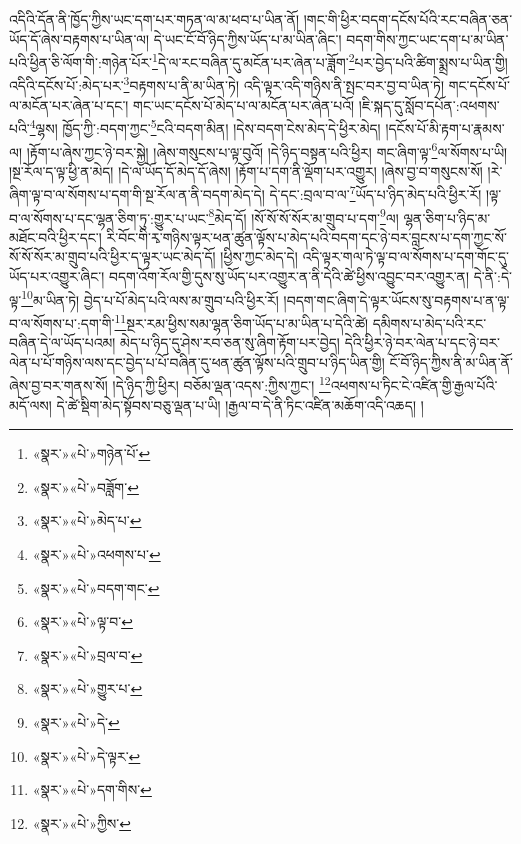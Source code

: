 འདིའི་དོན་ནི་ཁྱོད་ཀྱིས་ཡང་དག་པར་གཏན་ལ་མ་ཕབ་པ་ཡིན་ནོ། །གང་གི་ཕྱིར་བདག་དངོས་པོའི་རང་བཞིན་ཅན་ཡོད་དོ་ཞེས་བརྟགས་པ་ཡིན་ལ། དེ་ཡང་ངོ་བོ་ཉིད་ཀྱིས་ཡོད་པ་མ་ཡིན་ཞིང་། བདག་གིས་ཀྱང་ཡང་དག་པ་མ་ཡིན་པའི་ཕྱིན་ཅི་ལོག་གི་:གཉེན་པོར་\footnote{«སྣར་»«པེ་»གཉེན་པོ་}དེ་ལ་རང་བཞིན་དུ་མངོན་པར་ཞེན་པ་ཟློག་\footnote{«སྣར་»«པེ་»བཟློག་}པར་བྱེད་པའི་ཚིག་སྨྲས་པ་ཡིན་གྱི། འདིའི་དངོས་པོ་:མེད་པར་\footnote{«སྣར་»«པེ་»མེད་པ་}བརྟགས་པ་ནི་མ་ཡིན་ཏེ། འདི་ལྟར་འདི་གཉིས་ནི་སྤང་བར་བྱ་བ་ཡིན་ཏེ། གང་དངོས་པོ་ལ་མངོན་པར་ཞེན་པ་དང་། གང་ཡང་དངོས་པོ་མེད་པ་ལ་མངོན་པར་ཞེན་པའོ། །ཇི་སྐད་དུ་སློབ་དཔོན་:འཕགས་པའི་\footnote{«སྣར་»«པེ་»འཕགས་པ་}ལྷས། ཁྱོད་ཀྱི་:བདག་ཀྱང་\footnote{«སྣར་»«པེ་»བདག་གང་}ངའི་བདག་མིན། །དེས་བདག་ངེས་མེད་དེ་ཕྱིར་མེད། །དངོས་པོ་མི་རྟག་པ་རྣམས་ལ། །རྟོག་པ་ཞེས་ཀྱང་ཉེ་བར་སྐྱེ། །ཞེས་གསུངས་པ་ལྟ་བུའོ། །དེ་ཉིད་བསྟན་པའི་ཕྱིར། གང་ཞིག་ལྟ་\footnote{«སྣར་»«པེ་»ལྟ་བ་}ལ་སོགས་པ་ཡི། །སྔ་རོལ་ད་ལྟ་ཕྱི་ན་མེད། །དེ་ལ་ཡོད་དོ་མེད་དོ་ཞེས། །རྟོག་པ་དག་ནི་ལྡོག་པར་འགྱུར། །ཞེས་བྱ་བ་གསུངས་སོ། །རེ་ཞིག་ལྟ་བ་ལ་སོགས་པ་དག་གི་སྔ་རོལ་ན་ནི་བདག་མེད་དེ། དེ་དང་:བྲལ་བ་ལ་\footnote{«སྣར་»«པེ་»བྲལ་བ་}ཡོད་པ་ཉིད་མེད་པའི་ཕྱིར་རོ། །ལྟ་བ་ལ་སོགས་པ་དང་ལྷན་ཅིག་ཏུ་:གྱུར་པ་ཡང་\footnote{«སྣར་»«པེ་»གྱུར་པ་}མེད་དོ། །སོ་སོ་སོ་སོར་མ་གྲུབ་པ་དག་\footnote{«སྣར་»«པེ་»དེ་}ལ། ལྷན་ཅིག་པ་ཉིད་མ་མཐོང་བའི་ཕྱིར་དང་། རི་བོང་གི་རྭ་གཉིས་ལྟར་ཕན་ཚུན་ལྟོས་པ་མེད་པའི་བདག་དང་ཉེ་བར་བླངས་པ་དག་ཀྱང་སོ་སོ་སོ་སོར་མ་གྲུབ་པའི་ཕྱིར་ད་ལྟར་ཡང་མེད་དོ། །ཕྱིས་ཀྱང་མེད་དེ། འདི་ལྟར་གལ་ཏེ་ལྟ་བ་ལ་སོགས་པ་དག་གོང་དུ་ཡོད་པར་འགྱུར་ཞིང་། བདག་འོག་རོལ་གྱི་དུས་སུ་ཡོད་པར་འགྱུར་ན་ནི་དེའི་ཚེ་ཕྱིས་འབྱུང་བར་འགྱུར་ན། དེ་ནི་:དེ་ལྟ་\footnote{«སྣར་»«པེ་»དེ་ལྟར་}མ་ཡིན་ཏེ། བྱེད་པ་པོ་མེད་པའི་ལས་མ་གྲུབ་པའི་ཕྱིར་རོ། །བདག་གང་ཞིག་དེ་ལྟར་ཡོངས་སུ་བརྟགས་པ་ན་ལྟ་བ་ལ་སོགས་པ་:དག་གི་\footnote{«སྣར་»«པེ་»དག་གིས་}སྔར་རམ་ཕྱིས་སམ་ལྷན་ཅིག་ཡོད་པ་མ་ཡིན་པ་དེའི་ཚེ། དམིགས་པ་མེད་པའི་རང་བཞིན་དེ་ལ་ཡོད་པའམ། མེད་པ་ཉིད་དུ་ཤེས་རབ་ཅན་སུ་ཞིག་རྟོག་པར་བྱེད། དེའི་ཕྱིར་ཉེ་བར་ལེན་པ་དང་ཉེ་བར་ལེན་པ་པོ་གཉིས་ལས་དང་བྱེད་པ་པོ་བཞིན་དུ་ཕན་ཚུན་ལྟོས་པའི་གྲུབ་པ་ཉིད་ཡིན་གྱི། ངོ་བོ་ཉིད་ཀྱིས་ནི་མ་ཡིན་ནོ་ཞེས་བྱ་བར་གནས་སོ། །དེ་ཉིད་ཀྱི་ཕྱིར། བཅོམ་ལྡན་འདས་:ཀྱིས་ཀྱང་། \footnote{«སྣར་»«པེ་»ཀྱིས་}འཕགས་པ་ཏིང་ངེ་འཛིན་གྱི་རྒྱལ་པོའི་མདོ་ལས། དེ་ཚེ་སྡིག་མེད་སྟོབས་བཅུ་ལྡན་པ་ཡི། །རྒྱལ་བ་དེ་ནི་ཏིང་འཛིན་མཆོག་འདི་འཆད། །
